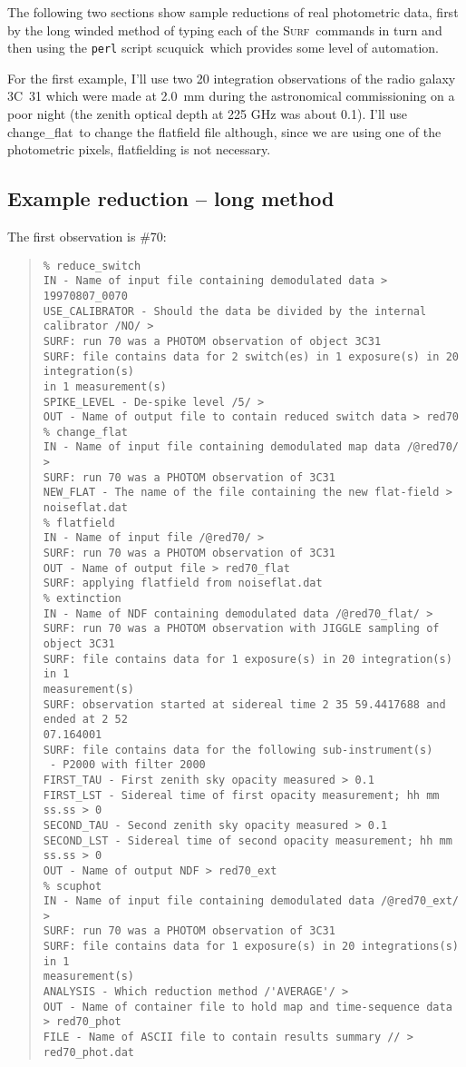 \documentclass[twoside,11pt,fleqn]{article}
\newenvironment{myquote}{\begin{quote}\begin{small}}{\end{small}\end{quote}}
\newcommand{\surf}{\xref{\textsc{Surf}}{sun216}{}}
\newcommand{\task}[1]{{\sf #1}}
\newcommand{\chgflat}{\xref{\task{change\_flat}}{sun216}{CHANGE_FLAT}}
\newcommand{\scuquick}{\xref{\task{scuquick}}{sun216}{SCUQUICK}}
\newcommand{\xref}[3]{#1}
\newcommand{\xlabel}[1]{}
\begin{document}
The following two sections show sample reductions of real photometric data,
first by the long winded method of typing each of the \surf\ commands in turn
and then using the {\tt perl} \cite{perl} script \scuquick\ which provides
some level of automation.

For the first example, I'll use two 20 integration observations of
the radio galaxy 3C~31 which were made at 2.0~mm during the
astronomical commissioning on a poor night (the zenith optical depth
at 225 GHz was about 0.1).  I'll use \chgflat\ to change the
flatfield file although, since we are using one of the photometric
pixels, flatfielding is not necessary.

\subsection{\xlabel{egred}Example reduction -- long method\label{egred}}

The first observation is \#70:

\begin{myquote}
\begin{verbatim}
% reduce_switch
IN - Name of input file containing demodulated data > 19970807_0070
USE_CALIBRATOR - Should the data be divided by the internal calibrator /NO/ > 
SURF: run 70 was a PHOTOM observation of object 3C31
SURF: file contains data for 2 switch(es) in 1 exposure(s) in 20 integration(s)
in 1 measurement(s)
SPIKE_LEVEL - De-spike level /5/ > 
OUT - Name of output file to contain reduced switch data > red70
% change_flat
IN - Name of input file containing demodulated map data /@red70/ > 
SURF: run 70 was a PHOTOM observation of 3C31
NEW_FLAT - The name of the file containing the new flat-field > noiseflat.dat
% flatfield
IN - Name of input file /@red70/ > 
SURF: run 70 was a PHOTOM observation of 3C31
OUT - Name of output file > red70_flat
SURF: applying flatfield from noiseflat.dat
% extinction
IN - Name of NDF containing demodulated data /@red70_flat/ > 
SURF: run 70 was a PHOTOM observation with JIGGLE sampling of object 3C31
SURF: file contains data for 1 exposure(s) in 20 integration(s) in 1
measurement(s)
SURF: observation started at sidereal time 2 35 59.4417688 and ended at 2 52
07.164001
SURF: file contains data for the following sub-instrument(s)
 - P2000 with filter 2000
FIRST_TAU - First zenith sky opacity measured > 0.1
FIRST_LST - Sidereal time of first opacity measurement; hh mm ss.ss > 0
SECOND_TAU - Second zenith sky opacity measured > 0.1
SECOND_LST - Sidereal time of second opacity measurement; hh mm ss.ss > 0
OUT - Name of output NDF > red70_ext
% scuphot
IN - Name of input file containing demodulated data /@red70_ext/ > 
SURF: run 70 was a PHOTOM observation of 3C31
SURF: file contains data for 1 exposure(s) in 20 integrations(s) in 1
measurement(s)
ANALYSIS - Which reduction method /'AVERAGE'/ > 
OUT - Name of container file to hold map and time-sequence data > red70_phot
FILE - Name of ASCII file to contain results summary // > red70_phot.dat
\end{verbatim}
\end{myquote}
\end{document}
